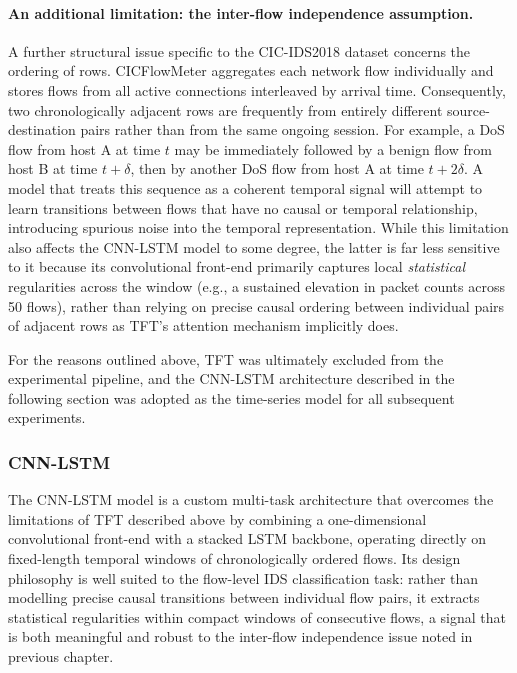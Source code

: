 \documentclass[../main.tex]{subfiles}
\begin{document}
\paragraph{An additional limitation: the inter-flow independence assumption.}
A further structural issue specific to the CIC-IDS2018 dataset concerns the ordering of rows.  CICFlowMeter aggregates each network flow individually and stores flows from all active connections interleaved by arrival time.  Consequently, two chronologically adjacent rows are frequently from entirely different source-destination pairs rather than from the same ongoing session.  For example, a DoS flow from host A at time $t$ may be immediately followed by a benign flow from host B at time $t{+}\delta$, then by another DoS flow from host A at time $t{+}2\delta$.  A model that treats this sequence as a coherent temporal signal will attempt to learn transitions between flows that have no causal or temporal relationship, introducing spurious noise into the temporal representation.  While this limitation also affects the CNN-LSTM model to some degree, the latter is far less sensitive to it because its convolutional front-end primarily captures local \emph{statistical} regularities across the window (e.g., a sustained elevation in packet counts across 50 flows), rather than relying on precise causal ordering between individual pairs of adjacent rows as TFT's attention mechanism implicitly does.

For the reasons outlined above, TFT was ultimately excluded from the experimental pipeline, and the CNN-LSTM architecture described in the following section was adopted as the time-series model for all subsequent experiments.

\newpage
\subsubsection{CNN-LSTM}
\label{Chapter: model cnn-lstm}

The CNN-LSTM model\supercite{jablaoui2024effective} is a custom multi-task architecture that overcomes the limitations of TFT described above by combining a one-dimensional convolutional front-end with a stacked LSTM backbone, operating directly on fixed-length temporal windows of chronologically ordered flows. Its design philosophy is well suited to the flow-level IDS classification task: rather than modelling precise causal transitions between individual flow pairs, it extracts statistical regularities within compact windows of consecutive flows, a signal that is both meaningful and robust to the inter-flow independence issue noted in previous chapter.
\end{document}
